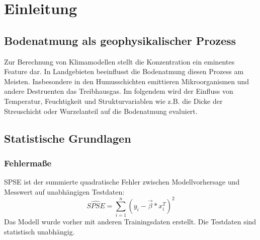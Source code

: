 \section{Einleitung}
\label{sec-intro}

\subsection{Bodenatmung als geophysikalischer Prozess}
Zur Berechnung von Klimamodellen stellt die Konzentration  ein eminentes Feature dar.
In Landgebieten beeinflusst die Bodenatmung diesen Prozess am Meisten.
Insbesondere in den Humusschichten emittieren Mikroorganismen und andere Destruenten das Treibhausgas.
Im folgendem wird der Einfluss von Temperatur, Feuchtigkeit und Strukturvariablen wie z.B. die Dicke der Streuschicht oder Wurzelanteil auf die Bodenatmung evaluiert.

\subsection{Statistische Grundlagen}

\subsubsection{Fehlermaße}
SPSE ist der summierte quadratische Fehler zwischen Modellvorhersage und Messwert auf unabhängigen Testdaten:
\begin{equation}
	\widehat{SPSE} = \sum_{i=1}^n (y_i - \vec{\beta} * x_i^T )^2
\end{equation}
Das Modell wurde vorher mit anderen Trainingsdaten erstellt.
Die Testdaten sind statistisch unabhängig.

